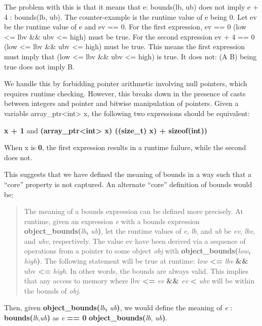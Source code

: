 \documentclass[]{article}
\begin{document}
The problem with this is that it means that e: bounds(lb, ub) does not
imply e + 4 : bounds(lb, ub). The counter-example is the runtime value
of e being 0. Let ev be the runtime value of e and ev == 0. For the
first expression, ev == 0 \textbar{}\textbar{} (low \textless{}= lbv
\&\& ubv \textless{}= high) must be true. For the second expression ev +
4 == 0 \textbar{}\textbar{} (low \textless{}= lbv \&\& ubv \textless{}=
high) must be true. This means the first expression must imply that (low
\textless{}= lbv \&\& ubv \textless{}= high) is true. It does not: (A
\textbar{}\textbar{} B) being true does not imply B.

We handle this by forbidding pointer arithmetic involving null pointers,
which requires runtime checking. However, this breaks down in the
presence of casts between integers and pointer and bitwise manipulation
of pointers. Given a variable array\_ptr\textless{}int\textgreater{} x,
the following two expressions should be equivalent:

\textbf{x + 1} and \textbf{(array\_ptr\textless{}int\textgreater{} x)
((size\_t) x) + sizeof(int))}

When x is \textbf{0}, the first expression results in a runtime failure,
while the second does not.

This suggests that we have defined the meaning of bounds in a way such
that a ``core'' property is not captured. An alternate ``core''
definition of bounds would be:

\begin{quote}
The meaning of a bounds expression can be defined more precisely. At
runtime, given an expression \emph{e} with a bounds expression
\textbf{object\_bounds(}\emph{lb}\textbf{,} \emph{ub}\textbf{)}, let the
runtime values of \emph{e}, \emph{lb}, and \emph{ub} be \emph{ev},
\emph{lbv}, and \emph{ubv}, respectively. The value ev have been derived
via a sequence of operations from a pointer to some object \emph{obj}
with \textbf{object\_bounds(}\emph{low}\textbf{,} \emph{high}\textbf{)}.
The following statement will be true at runtime: \emph{low}
\textbf{\textless{}=} \emph{lbv} \textbf{\&\&} ubv \textbf{\textless{}=}
\emph{high}. In other words, the bounds are always valid. This implies
that any access to memory where lbv \textbf{\textless{}=} \emph{ev}
\textbf{\&\&} \emph{ev} \textbf{\textless{}} \emph{ubv} will be within
the bounds of \emph{obj}.
\end{quote}

Then, given \textbf{object\_bounds(}\emph{lb}\textbf{,}
\emph{ub}\textbf{)}, we would define the meaning of \emph{e} :
\textbf{bounds(}\emph{lb},\emph{ub}\textbf{)} as \emph{e} \textbf{== 0
\textbar{}\textbar{}} \textbf{object\_bounds(}\emph{lb},
\emph{ub}\textbf{)}.
\end{document}
